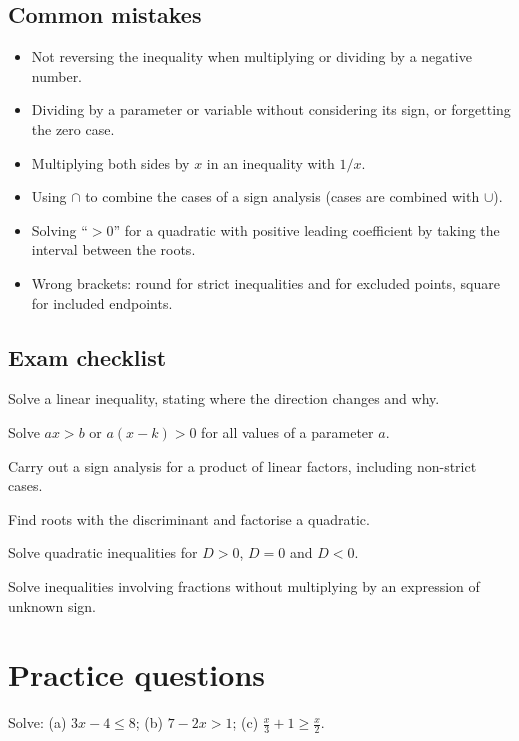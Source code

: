 \subsection*{Common mistakes}
\begin{itemize}
  \item Not reversing the inequality when multiplying or dividing by a negative number.
  \item Dividing by a parameter or variable without considering its sign, or forgetting the zero case.
  \item Multiplying both sides by $x$ in an inequality with $1/x$.
  \item Using $\cap$ to combine the cases of a sign analysis (cases are combined with $\cup$).
  \item Solving ``$>0$'' for a quadratic with positive leading coefficient by taking the interval between the roots.
  \item Wrong brackets: round for strict inequalities and for excluded points, square for included endpoints.
\end{itemize}

\subsection*{Exam checklist}
\begin{checklist}
  \item Solve a linear inequality, stating where the direction changes and why.
  \item Solve $ax>b$ or $a(x-k)>0$ for all values of a parameter $a$.
  \item Carry out a sign analysis for a product of linear factors, including non-strict cases.
  \item Find roots with the discriminant and factorise a quadratic.
  \item Solve quadratic inequalities for $D>0$, $D=0$ and $D<0$.
  \item Solve inequalities involving fractions without multiplying by an expression of unknown sign.
\end{checklist}

\section{Practice questions}
\pq[basic] Solve: (a) $3x-4\le 8$; (b) $7-2x>1$; (c) $\tfrac{x}{3}+1\ge \tfrac{x}{2}$.

